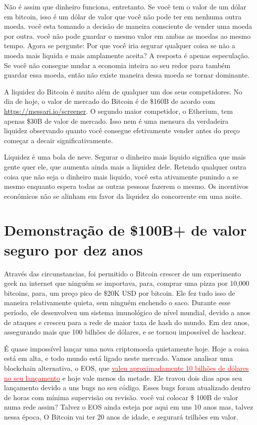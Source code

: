 Não é assim que dinheiro funciona, entretanto. Se você tem o valor de um dólar em bitcoin, isso é um dólar de valor que você não pode ter em nenhuma outra moeda.
você esta tomando a decisão de maneira consciente de vender uma moeda por outra.
você não pode guardar o mesmo valor em ambas as moedas ao mesmo tempo. 
Agora se pergunte: Por que você iria segurar qualquer coisa se não a moeda mais liquida e mais amplamente aceita?
A resposta é apenas especulação. 
Se você não consegue mudar a economia inteira ao seu redor para também guardar essa moeda, então não existe maneira dessa moeda se tornar dominante.

A liquidez do Bitcoin é muito além de qualquer um dos seus competidores. 
No dia de hoje, o valor de mercado do Bitcoin é de \$160B de acordo com \url{https://messari.io/screener}. O segundo maior competidor, o Etherium, tem apenas \$30B de valor de mercado.
Isso nem é uma mensura da verdadeira liquidez observando quanto você consegue efetivamente vender antes do preço começar a decair significativamente.

Liquidez é uma bola de neve.
Segurar o dinheiro mais liquido significa que mais gente quer ele, que aumenta ainda mais a liquidez dele. 
Retendo qualquer outra coisa que não seja o dinheiro mais liquido, você esta ativamente punindo a se mesmo enquanto espera todas as outras pessoas fazerem o mesmo. 
Os incentivos econômicos não se alinham em favor da liquidez do concorrente em uma noite.

\section*{Demonstração de \$100B+ de valor seguro por dez anos}

Através das circunstancias, foi permitido o Bitcoin crescer de um experimento geek na internet que ninguém se importava, para, comprar uma pizza por 10,000 bitcoins, para, um preço pico de \$20K USD por bitcoin. Ele fez tudo isso de maneira relativamente quieta, sem ninguém enchendo o saco. 
Durante esse período, ele desenvolveu um sistema imunológico de nível mundial, devido a anos de ataques e cresceu para a rede de maior taxa de hash do mundo. 
Em dez anos, assegurando mais que 100 bilhões de dólares, e se tornou impossível de hackear.

É quase impossível lançar uma nova criptomoeda quietamente hoje.
Hoje a coisa está em alta, e todo mundo está ligado neste mercado.
Vamos analisar uma blockchain alternativa, o EOS, que \href{https://coinmarketcap.com/currencies/eos/}{\textcolor{red}{valeu aproximadamente 10 bilhões de dólares no seu lançamento}} e hoje vale menos da metade. 
Ele travou dois dias apos seu lançamento devido a uns bugs no seu código. 
Esses bugs foram atualizado dentro de horas com mínima supervisão ou revisão. 
você vai colocar \$ 100B de valor numa rede assim? 
Talvez o EOS ainda esteja por aqui em uns 10 anos mas, talvez nessa época, O Bitcoin vai ter 20 anos de idade, e segurará trilhões em valor.

